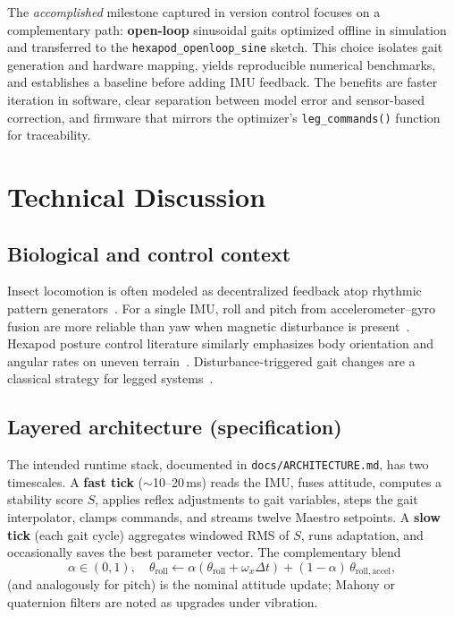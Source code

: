 \documentclass[11pt]{article}
\begin{document}
The \emph{accomplished} milestone captured in version control focuses on a complementary path: \textbf{open-loop} sinusoidal gaits optimized offline in simulation and transferred to the \texttt{hexapod\_openloop\_sine} sketch. This choice isolates gait generation and hardware mapping, yields reproducible numerical benchmarks, and establishes a baseline before adding IMU feedback. The benefits are faster iteration in software, clear separation between model error and sensor-based correction, and firmware that mirrors the optimizer's \texttt{leg\_commands()} function for traceability.

\section{Technical Discussion}

\subsection{Biological and control context}
Insect locomotion is often modeled as decentralized feedback atop rhythmic pattern generators~\cite{aydin2023mechanosensory,chen2021adaptive}. For a single IMU, roll and pitch from accelerometer--gyro fusion are more reliable than yaw when magnetic disturbance is present~\cite{valenti2015quaternion,zhang2021attitude}. Hexapod posture control literature similarly emphasizes body orientation and angular rates on uneven terrain~\cite{bai2019posture}. Disturbance-triggered gait changes are a classical strategy for legged systems~\cite{johnson2010disturbance}.

\subsection{Layered architecture (specification)}
The intended runtime stack, documented in \texttt{docs/ARCHITECTURE.md}, has two timescales. A \textbf{fast tick} ($\sim$10--20\,ms) reads the IMU, fuses attitude, computes a stability score $S$, applies reflex adjustments to gait variables, steps the gait interpolator, clamps commands, and streams twelve Maestro setpoints. A \textbf{slow tick} (each gait cycle) aggregates windowed RMS of $S$, runs adaptation, and occasionally saves the best parameter vector. The complementary blend\begin{equation}
\alpha \in (0,1),\quad
\theta_{\mathrm{roll}} \leftarrow \alpha(\theta_{\mathrm{roll}} + \omega_x \Delta t) + (1-\alpha)\,\theta_{\mathrm{roll,accel}},
\end{equation}
(and analogously for pitch) is the nominal attitude update; Mahony or quaternion filters are noted as upgrades under vibration.
\end{document}
